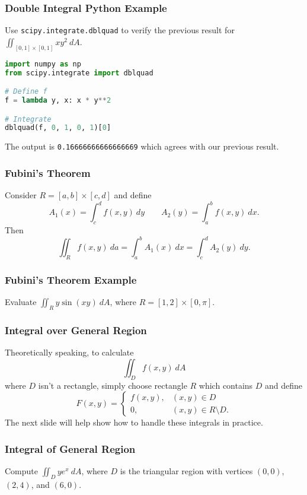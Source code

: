 \documentclass{beamer}
\begin{document}
\begin{frame}[fragile]
\frametitle{Double Integral Python Example}
\small
\begin{Example}
Use \texttt{scipy.integrate.dblquad} to verify the previous result for $\displaystyle\iint_{[0,1]\times[0, 1]} xy^2\ dA$.
\end{Example}
\begin{lstlisting}[language=Python]
import numpy as np
from scipy.integrate import dblquad

# Define f
f = lambda y, x: x * y**2

# Integrate
dblquad(f, 0, 1, 0, 1)[0]
\end{lstlisting}
The output is \texttt{0.16666666666666669} which agrees with our previous result. 

\end{frame}

\begin{frame}
\frametitle{Fubini's Theorem}
\begin{Theorem}[Fubini]
Consider $R = [a, b]\times [c, d]$ and define
$$
A_1(x) = \int_c^d f(x, y)\ dy\qquad A_2(y) = \int_a^b f(x, y)\ dx.
$$
Then
$$
\iint_R f(x, y)\ da = \int_a^b A_1(x)\ dx = \int_c^d A_2(y)\ dy.
$$
\end{Theorem}
\end{frame}

\begin{frame}[t]
\frametitle{Fubini's Theorem Example}
\begin{Example}
Evaluate $\displaystyle\iint_R y\sin(xy)\ dA$, where $R = [1, 2]\times [0, \pi]$.
\end{Example}

\end{frame}

\begin{frame}
\frametitle{Integral over General Region}
Theoretically speaking, to calculate
$$
\iint_D f(x, y)\ dA
$$
where $D$ isn't a rectangle, simply choose rectangle $R$ which contains $D$ and define
$$
F(x, y) = \begin{cases} f(x, y),	&	(x, y)\in D\\ 0,	&	(x,y)\in R\setminus D.\end{cases}
$$
The next slide will help show how to handle these integrals in practice. 
\end{frame}

\begin{frame}[t]
\frametitle{Integral of General  Region}
\begin{Example}
Compute $\displaystyle\iint_D ye^x\ dA$, where $D$ is the triangular region with vertices $(0, 0)$, $(2, 4)$, and $(6, 0)$.
\end{Example}

\end{frame}
\end{document}
